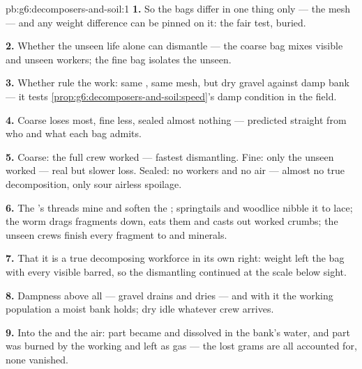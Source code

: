 \begin{solution}{pb:g6:decomposers-and-soil:1}
\textbf{1.} So the bags differ in one thing only --- the
mesh --- and any weight difference can be pinned on it: the
fair test, buried.

\textbf{2.} Whether the unseen  life alone can dismantle
 --- the coarse bag mixes visible and unseen workers;
the fine bag isolates the unseen.

\textbf{3.} Whether  rule the work: same ,
same mesh, but dry gravel against damp bank --- it tests
\cref{prop:g6:decomposers-and-soil:speed}'s damp condition
in the field.

\textbf{4.} Coarse loses most, fine less, sealed almost
nothing --- predicted straight from who and what each bag
admits.

\textbf{5.} Coarse: the full crew worked --- fastest
dismantling. Fine: only the unseen worked --- real but
slower loss. Sealed: no workers and no air --- almost no
true decomposition, only sour airless spoilage.

\textbf{6.} The 's threads mine and soften the ;
springtails and woodlice nibble it to lace; the worm drags
fragments down, eats them and casts out worked crumbs; the
unseen crews finish every fragment to  and minerals.

\textbf{7.} That it is a true decomposing workforce in its
own right: weight left the bag with every visible 
barred, so the dismantling continued at the scale below
sight.

\textbf{8.} Dampness above all --- gravel drains and dries
--- and with it the working population a moist bank holds;
dry  idle whatever crew arrives.

\textbf{9.} Into the  and the air: part became 
and dissolved  in the bank's  water, and
part was burned by the working  and left as gas
--- the lost grams are all accounted for, none vanished.


\end{solution}

